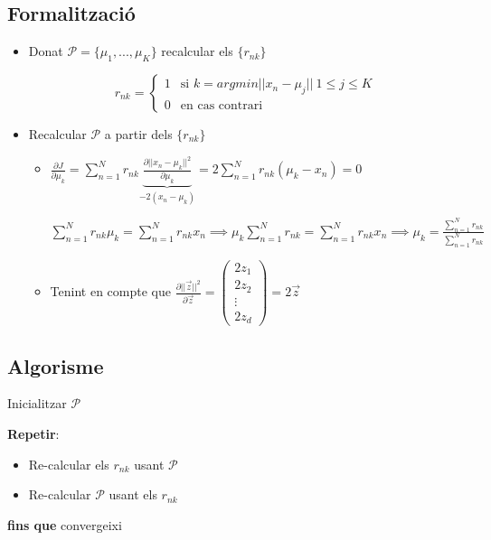 \documentclass[a4paper]{article}
\begin{document}
\subsection{Formalització}
\begin{itemize}
	\item Donat $\mathcal{P} = \{ \mu_1, ..., \mu_K \}$ recalcular els $\{r_{nk}\}$
	
	$$ r_{nk} =
	\begin{cases}
	1 & \text{si } k = argmin ||x_n - \mu_j||\ 1 \le j \le K \\ 0 & \text{en cas contrari}
	\end{cases}$$
	
	\item Recalcular $\mathcal{P}$ a partir dels $\{r_{nk}\}$
	
	\begin{itemize}
		\item $\frac{\partial J}{\partial \mu_k} = \sum_{n=1}^N r_{nk} \underbrace{\frac{\partial ||x_n - \mu_k||^2}{\partial \mu_k}}_{-2(x_n - \mu_k)} = 2\sum_{n=1}^N r_{nk} (\mu_k - x_n) = 0$
		
		$\sum_{n=1}^N r_{nk}\mu_k = \sum_{n=1}^N r_{nk}x_n \implies \mu_k\sum_{n=1}^N r_{nk} = \sum_{n=1}^N r_{nk}x_n \implies \boxed{\mu_k = \frac{\sum_{n=1}^N r_{nk}}{\sum_{n=1}^N r_{nk}}}$
		
		\item Tenint en compte que $\frac{\partial ||\vec{z}||^2}{\partial \vec{z}} = \begin{pmatrix}
		2z_1 \\ 2z_2 \\ \vdots \\ 2z_d
		\end{pmatrix} = 2\vec{z}$
	\end{itemize}
\end{itemize}

\subsection{Algorisme}

Inicialitzar $\mathcal{P}$

\textbf{Repetir}:
\begin{itemize}
	\item Re-calcular els $r_{nk}$ usant $\mathcal{P}$
	\item Re-calcular $\mathcal{P}$ usant els $r_{nk}$
\end{itemize}
\textbf{fins que} convergeixi
\end{document}
